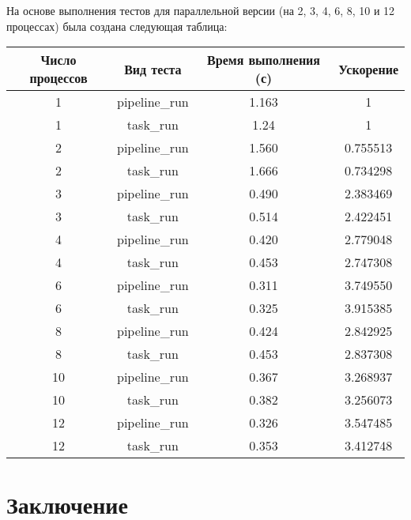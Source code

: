 \documentclass[a4paper,12pt]{article}
\begin{document}
На основе выполнения тестов для параллельной версии (на 2, 3, 4, 6, 8, 10 и 12 процессах) была создана следующая таблица:

\begin{tabular}{|c|c|c|c|}
    \hline
    Число процессов & Вид теста      & Время выполнения (с) & Ускорение \\ \hline
    1               & pipeline\_run & 1.163               & 1      \\ \hline
    1               & task\_run     & 1.24                & 1      \\ \hline
    2               & pipeline\_run & 1.560                & 0.755513      \\ \hline
    2               & task\_run     & 1.666                & 0.734298      \\ \hline
    3               & pipeline\_run & 0.490                & 2.383469      \\ \hline
    3               & task\_run     & 0.514                & 2.422451      \\ \hline
    4               & pipeline\_run & 0.420               & 2.779048     \\ \hline
    4               & task\_run     & 0.453                & 2.747308      \\ \hline
    6              & pipeline\_run & 0.311                & 3.749550      \\ \hline
    6              & task\_run     & 0.325                & 3.915385      \\ \hline
    8              & pipeline\_run & 0.424                & 2.842925      \\ \hline
    8              & task\_run     & 0.453                & 2.837308      \\ \hline
    10              & pipeline\_run & 0.367                & 3.268937      \\ \hline
    10              & task\_run     & 0.382                & 3.256073      \\ \hline
    12              & pipeline\_run & 0.326                & 3.547485      \\ \hline
    12              & task\_run     & 0.353                & 3.412748      \\ \hline
\end{tabular}

\newpage

\section*{\centering Заключение}
\end{document}
